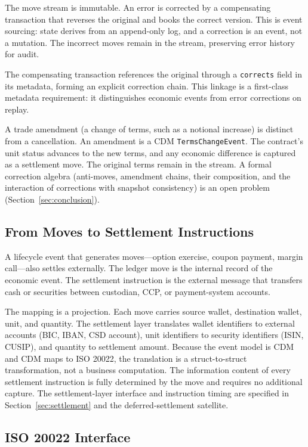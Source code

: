 The move stream is immutable. An error is corrected by a compensating transaction that reverses the original and books the correct version. This is event sourcing: state derives from an append-only log, and a correction is an event, not a mutation. The incorrect moves remain in the stream, preserving error history for audit.

The compensating transaction references the original through a \texttt{corrects} field in its metadata, forming an explicit correction chain. This linkage is a first-class metadata requirement: it distinguishes economic events from error corrections on replay.

A trade amendment (a change of terms, such as a notional increase) is distinct from a cancellation. An amendment is a CDM \texttt{TermsChangeEvent}. The contract's unit status advances to the new terms, and any economic difference is captured as a settlement move. The original terms remain in the stream. A formal correction algebra (anti-moves, amendment chains, their composition, and the interaction of corrections with snapshot consistency) is an open problem (Section~\ref{sec:conclusion}).

\subsection{From Moves to Settlement Instructions}
\label{sec:implementation-settlement}

A lifecycle event that generates moves---option exercise, coupon payment, margin call---also settles externally. The ledger move is the internal record of the economic event. The settlement instruction is the external message that transfers cash or securities between custodian, CCP, or payment-system accounts.

The mapping is a projection. Each move carries source wallet, destination wallet, unit, and quantity. The settlement layer translates wallet identifiers to external accounts (BIC, IBAN, CSD account), unit identifiers to security identifiers (ISIN, CUSIP), and quantity to settlement amount. Because the event model is CDM and CDM maps to ISO 20022, the translation is a struct-to-struct transformation, not a business computation. The information content of every settlement instruction is fully determined by the move and requires no additional capture. The settlement-layer interface and instruction timing are specified in Section~\ref{sec:settlement} and the deferred-settlement satellite.

\subsection{ISO 20022 Interface}
\label{sec:implementation-iso}

